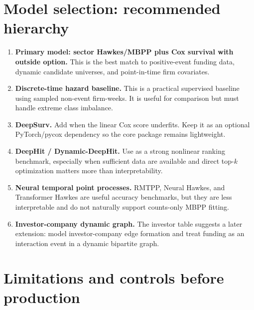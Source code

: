 \documentclass[11pt]{article}
\theoremstyle{plain}
\theoremstyle{definition}
\theoremstyle{remark}
\begin{document}
\section{Model selection: recommended hierarchy}
\label{sec:recommendations}

\begin{enumerate}[leftmargin=1.5em]
\item \textbf{Primary model: sector Hawkes/MBPP plus Cox survival with outside option.} This is the best match to positive-event funding data, dynamic candidate universes, and point-in-time firm covariates.
\item \textbf{Discrete-time hazard baseline.} This is a practical supervised baseline using sampled non-event firm-weeks. It is useful for comparison but must handle extreme class imbalance.
\item \textbf{DeepSurv.} Add when the linear Cox score underfits. Keep it as an optional PyTorch/pycox dependency so the core package remains lightweight.
\item \textbf{DeepHit / Dynamic-DeepHit.} Use as a strong nonlinear ranking benchmark, especially when sufficient data are available and direct top-$k$ optimization matters more than interpretability.
\item \textbf{Neural temporal point processes.} RMTPP, Neural Hawkes, and Transformer Hawkes are useful accuracy benchmarks, but they are less interpretable and do not naturally support counts-only MBPP fitting.
\item \textbf{Investor-company dynamic graph.} The investor table suggests a later extension: model investor-company edge formation and treat funding as an interaction event in a dynamic bipartite graph.
\end{enumerate}

\section{Limitations and controls before production}
\label{sec:limitations}
\end{document}
